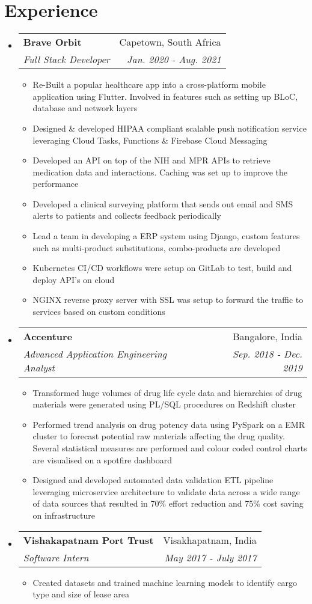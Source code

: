 \documentclass[letterpaper,10pt]{article}
\makeatletter
\newcommand{\resumeItemClean}[1]{
    \item\small{
        {#1 \vspace{-2pt}}
    }
}
\newcommand{\resumeSubheading}[4]{
  \vspace{-1pt}\item
    \begin{tabular*}{0.97\textwidth}[t]{l@{\extracolsep{\fill}}r}
      \textbf{#1} & #2 \\
      \textit{\small#3} & \textit{\small #4} \\
    \end{tabular*}\vspace{-5pt}
}
\newcommand{\resumeSubHeadingListStart}{\begin{itemize}[leftmargin=*]}
\newcommand{\resumeSubHeadingListEnd}{\end{itemize}}
\newcommand{\resumeItemListStart}{\begin{itemize}}
\newcommand{\resumeItemListEnd}{\end{itemize}\vspace{-5pt}}
\makeatother
\begin{document}
\section{Experience}
    \resumeSubHeadingListStart
    \resumeSubheading{Brave Orbit}{Capetown, South Africa}
        {Full Stack Developer}{Jan. 2020 - Aug. 2021}
            \resumeItemListStart
                \resumeItemClean
                    {Re-Built a popular healthcare app into a cross-platform mobile application using Flutter. Involved in features such as setting up BLoC, database and network layers}
                  \resumeItemClean
                    {Designed \& developed HIPAA compliant scalable push notification service leveraging Cloud Tasks, Functions & Firebase Cloud Messaging}
                  \resumeItemClean
                    {Developed an API on top of the NIH and MPR APIs to retrieve medication data and interactions. Caching was set up to improve the performance}
                  \resumeItemClean
                    {Developed a clinical surveying platform that sends out email and SMS alerts to patients and collects feedback periodically}
                  \resumeItemClean
                    {Lead a team in developing a ERP system using Django, custom features such as multi-product substitutions, combo-products are developed}
                  \resumeItemClean
                    {Kubernetes CI/CD workflows were setup on GitLab to test, build and deploy API's on cloud}
                  \resumeItemClean
                    {NGINX reverse proxy server with SSL was setup to forward the traffic to services based on custom conditions}
              \resumeItemListEnd
    \resumeSubheading
    	{Accenture}{Bangalore, India}
    	{Advanced Application Engineering Analyst}{Sep. 2018 -  Dec. 2019}
    	    \resumeItemListStart
                \resumeItemClean
                  {Transformed huge volumes of drug life cycle data and hierarchies of drug materials were generated using PL/SQL procedures on Redshift cluster}
                \resumeItemClean
                  {Performed trend analysis on drug potency data using PySpark on a EMR cluster to forecast potential raw materials affecting the drug quality. Several statistical measures are performed and colour coded control charts are visualised on a spotfire dashboard}
                \resumeItemClean
                  {Designed and developed automated data validation ETL pipeline leveraging microservice architecture to validate data across a wide range of data sources that resulted in 70\% effort reduction and 75\% cost saving on infrastructure}
    	    \resumeItemListEnd
    \resumeSubheading
    	{Vishakapatnam Port Trust}{Visakhapatnam, India}
    	{Software Intern}{May 2017 -  July 2017}
    	    \resumeItemListStart
                \resumeItemClean
                  {Created datasets and trained machine learning models to identify cargo type and size of lease area}
    	    \resumeItemListEnd
    \resumeSubHeadingListEnd
\end{document}
